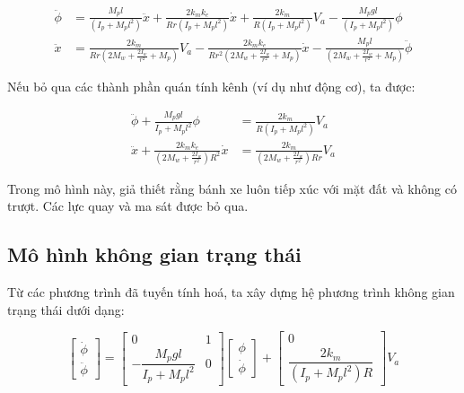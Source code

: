             \begin{align}
                \ddot{\phi} &= \frac{M_p l}{(I_p + M_p l^2)} \ddot{x}
                + \frac{2k_m k_e}{R r (I_p + M_p l^2)} \dot{x}
                + \frac{2k_m}{R (I_p + M_p l^2)} V_a
                - \frac{M_p g l}{(I_p + M_p l^2)} \phi
                \\[1ex]
                \ddot{x} &= \frac{2k_m}{R r \left( 2M_w + \frac{2I_w}{r^2} + M_p \right)} V_a
                - \frac{2k_m k_e}{R r^2 \left( 2M_w + \frac{2I_w}{r^2} + M_p \right)} \dot{x}
                - \frac{M_p l}{\left( 2M_w + \frac{2I_w}{r^2} + M_p \right)} \ddot{\phi}
            \end{align}

            Nếu bỏ qua các thành phần quán tính kênh (ví dụ như động cơ), ta được:

            \begin{align}
                \ddot{\phi} + \frac{M_p g l}{I_p + M_p l^2} \phi &= \frac{2k_m}{R (I_p + M_p l^2)} V_a  \\[1ex]
                \ddot{x} + \frac{2k_m k_e}{(2M_w + \frac{2I_w}{r^2}) R^2} \dot{x} &= \frac{2k_m}{(2M_w + \frac{2I_w}{r^2}) R r} V_a
            \end{align}

            \noindent
            \hspace*{0.6cm}Trong mô hình này, giả thiết rằng bánh xe luôn tiếp xúc với mặt đất và không có trượt. Các lực quay và ma sát được bỏ qua.

            \subsection{Mô hình không gian trạng thái}

            \hspace*{0.6cm}Từ các phương trình đã tuyến tính hoá, ta xây dựng hệ phương trình không gian trạng thái dưới dạng:

            \begin{equation}
                \begin{bmatrix}
                    \dot{\phi} \\
                    \ddot{\phi}
                \end{bmatrix}
                =
                \begin{bmatrix}
                    0 & 1 \\
                    -\dfrac{M_p g l}{I_p + M_p l^2} & 0
                \end{bmatrix}
                \begin{bmatrix}
                    \phi \\
                    \dot{\phi}
                \end{bmatrix}
                +
                \begin{bmatrix}
                    0 \\
                    \dfrac{2k_m}{(I_p + M_p l^2) R}
                \end{bmatrix}
                 V_a
            \end{equation}

